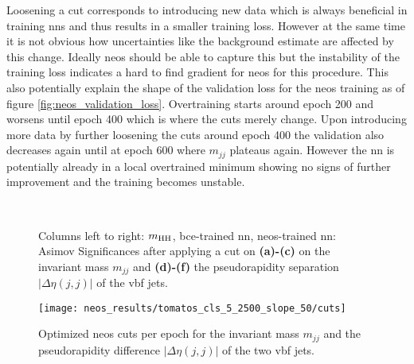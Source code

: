 Loosening a cut corresponds to introducing new data which is always beneficial in training \acp{nn} and thus results in a smaller training loss. However at the same time it is not obvious how uncertainties like the background estimate are affected by this change. Ideally \ac{neos} should be able to capture this but the instability of the training loss indicates a hard to find gradient for \ac{neos} for this procedure. This also potentially explain the shape of the validation loss for the \ac{neos} training as of figure \ref{fig:neos_validation_loss}. Overtraining starts around epoch 200 and worsens until epoch 400 which is where the cuts merely change. Upon introducing more data by further loosening the cuts around epoch 400 the validation also decreases again until at epoch 600 where $m_{jj}$ plateaus again. However the \ac{nn} is potentially already in a local overtrained minimum showing no signs of further improvement and the training becomes unstable. 


\begin{figure}
    \centering
    \\
    \caption[]{Columns left to right: $m_\text{HH}$, \ac{bce}-trained \ac{nn}, \ac{neos}-trained \ac{nn}: Asimov Significances after applying a cut on \textbf{(a)-(c)} on the invariant mass $m_{jj}$ and \textbf{(d)-(f)} the pseudorapidity separation $|\Delta\eta(j,j)|$ of the \ac{vbf} jets. }
    \label{fig:cut_scan}
\end{figure}

\begin{figure}
    \centering
    \texttt{[image: neos\_results/tomatos\_cls\_5\_2500\_slope\_50/cuts]}
    \caption[]{Optimized \ac{neos} cuts per epoch for the invariant mass $m_{jj}$ and the pseudorapidity difference $|\Delta\eta(j,j)|$ of the two \ac{vbf} jets.}
    \label{fig:neos_cuts}
\end{figure}

